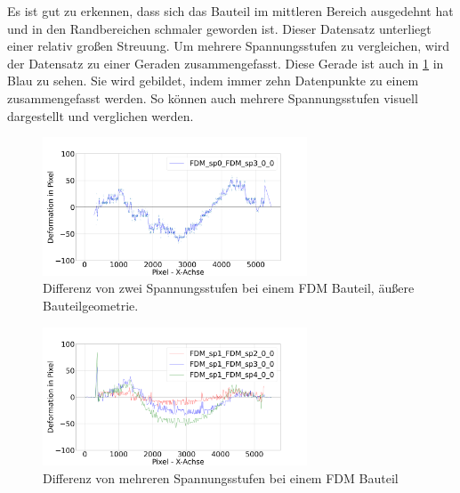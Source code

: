 Es ist gut zu erkennen, dass sich das Bauteil 
im mittleren Bereich ausgedehnt hat und in den Randbereichen schmaler geworden ist.
Dieser Datensatz unterliegt einer relativ großen Streuung. Um mehrere Spannungsstufen
zu vergleichen, wird der Datensatz zu einer Geraden zusammengefasst.
Diese Gerade ist auch in \ref{fig:deformation_data} in Blau zu sehen. Sie wird 
gebildet, indem immer zehn Datenpunkte zu einem zusammengefasst werden. 
So können auch mehrere Spannungsstufen visuell dargestellt und verglichen werden.

\begin{figure}[H]
    \centering
    \includegraphics[width=0.7\textwidth]{images/FDM_sp0_sp3_defo_plot.png}
    \caption{Differenz von zwei Spannungsstufen bei einem FDM Bauteil, äußere 
    Bauteilgeometrie.}
    \label{fig:deformation_data}
\end{figure}

\begin{figure}[H]
    \centering
    \includegraphics[width=0.7\textwidth]{images/FDM_sp0_many_defo_plot2.png}
    \caption{Differenz von mehreren Spannungsstufen bei einem FDM Bauteil}
    \label{fig:deformation_data_all}
\end{figure}



